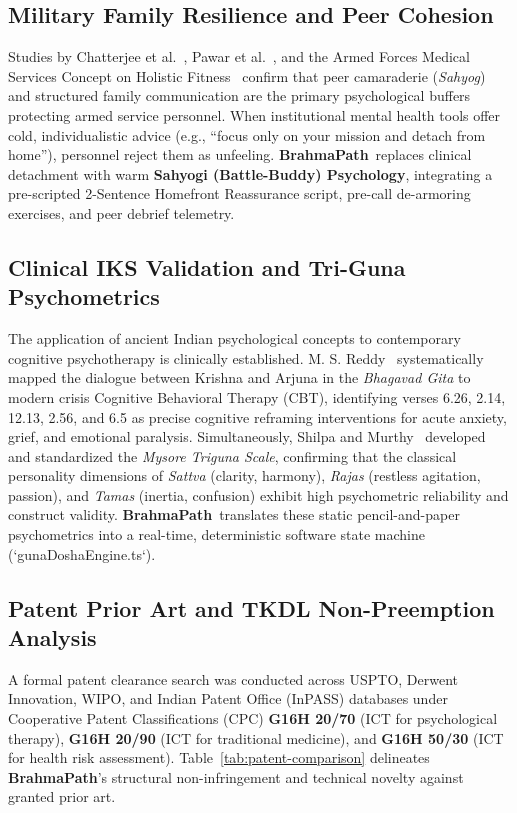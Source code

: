 \documentclass[11pt,a4paper]{article}
\newcommand{\AppName}{\textbf{BrahmaPath}}
\begin{document}
\subsection{Military Family Resilience and Peer Cohesion}
Studies by Chatterjee et al.~\cite{chatterjee2024resilience}, Pawar et al.~\cite{pawar2012occupationalstress}, and the Armed Forces Medical Services Concept on Holistic Fitness~\cite{afms2023holisticfitness} confirm that peer camaraderie (\textit{Sahyog}) and structured family communication are the primary psychological buffers protecting armed service personnel. When institutional mental health tools offer cold, individualistic advice (e.g., ``focus only on your mission and detach from home''), personnel reject them as unfeeling. \AppName\ replaces clinical detachment with warm \textbf{Sahyogi (Battle-Buddy) Psychology}, integrating a pre-scripted 2-Sentence Homefront Reassurance script, pre-call de-armoring exercises, and peer debrief telemetry.

\subsection{Clinical IKS Validation and Tri-Guna Psychometrics}
The application of ancient Indian psychological concepts to contemporary cognitive psychotherapy is clinically established. M. S. Reddy~\cite{reddy2012psychotherapy} systematically mapped the dialogue between Krishna and Arjuna in the \textit{Bhagavad Gita} to modern crisis Cognitive Behavioral Therapy (CBT), identifying verses 6.26, 2.14, 12.13, 2.56, and 6.5 as precise cognitive reframing interventions for acute anxiety, grief, and emotional paralysis. Simultaneously, Shilpa and Murthy~\cite{shilpa2012trigunascale} developed and standardized the \textit{Mysore Triguna Scale}, confirming that the classical personality dimensions of \textit{Sattva} (clarity, harmony), \textit{Rajas} (restless agitation, passion), and \textit{Tamas} (inertia, confusion) exhibit high psychometric reliability and construct validity. \AppName\ translates these static pencil-and-paper psychometrics into a real-time, deterministic software state machine (`gunaDoshaEngine.ts`).

\subsection{Patent Prior Art and TKDL Non-Preemption Analysis}
A formal patent clearance search was conducted across USPTO, Derwent Innovation, WIPO, and Indian Patent Office (InPASS) databases under Cooperative Patent Classifications (CPC) \textbf{G16H 20/70} (ICT for psychological therapy), \textbf{G16H 20/90} (ICT for traditional medicine), and \textbf{G16H 50/30} (ICT for health risk assessment). Table~\ref{tab:patent-comparison} delineates \AppName's structural non-infringement and technical novelty against granted prior art.
\end{document}
